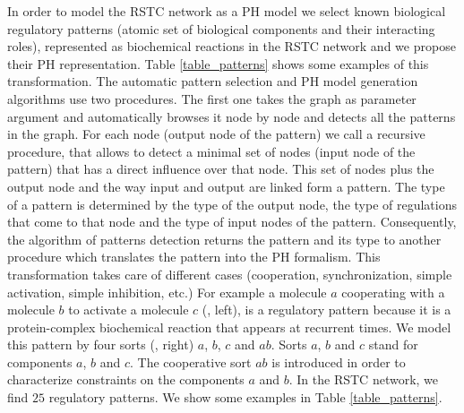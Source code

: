 In order to model the RSTC network as a PH model we select known biological regulatory patterns (atomic set of biological components and their interacting roles), represented 
as biochemical reactions in the RSTC network and we propose their PH representation. Table \ref{table_patterns} shows some examples of this transformation. 
The automatic pattern selection and PH model generation algorithms use two procedures. 
The first one takes the graph as parameter argument and automatically browses it node by node and detects all the patterns in the graph. 
For each node (output node of the pattern) we  call a recursive procedure,
that  allows  to detect a minimal set of nodes (input node of the pattern) that has a direct influence over that node. 
This set of nodes plus the output node and the way  input and output are linked form a pattern. 
The type of a pattern is determined by the type of the output node, the type of regulations that come to that node and the type of input nodes of the pattern. 
Consequently, the algorithm of patterns detection returns the pattern 
and its type to another procedure  which  translates the pattern into the PH formalism. This transformation  takes care of different cases (cooperation, synchronization, simple activation, simple inhibition, etc.)
For example a molecule $a$ cooperating with a molecule $b$ to activate a molecule $c$ (, left), is a regulatory pattern because it is a protein-complex biochemical reaction that appears at recurrent times.  
We model this pattern by four sorts (, right) $a$, $b$, $c$ and $ab$. Sorts $a$, $b$ and $c$
stand for components $a$, $b$ and $c$. The cooperative sort $ab$ is introduced in order to characterize constraints on the components $a$ and $b$.
In the RSTC network, we find  $25$ regulatory patterns. We show some examples in Table \ref{table_patterns}.     %

